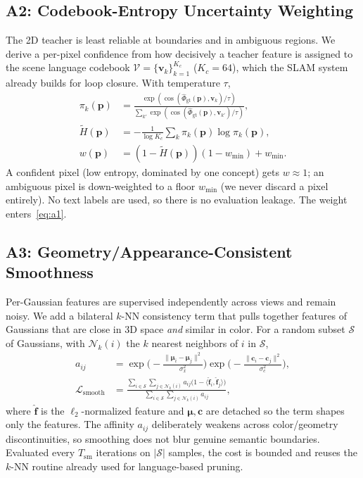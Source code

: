 \documentclass[10pt, journal]{IEEEtran}
\begin{document}
\subsection{A2: Codebook-Entropy Uncertainty Weighting}\label{sec:a2}
The 2D teacher is least reliable at boundaries and in ambiguous regions. We derive
a per-pixel confidence from how decisively a teacher feature is assigned to the
scene language codebook $\mathcal{V}=\{\mathbf{v}_k\}_{k=1}^{K_c}$ ($K_c\!=\!64$),
which the SLAM system already builds for loop closure. With temperature $\tau$,
\begin{align}
\pi_k(\mathbf{p}) &= \frac{\exp(\cos(\hat{\Phi}_{\text{gt}}(\mathbf{p}),\mathbf{v}_k)/\tau)}{\sum_{k'}\exp(\cos(\hat{\Phi}_{\text{gt}}(\mathbf{p}),\mathbf{v}_{k'})/\tau)},\\
\tilde{H}(\mathbf{p}) &= -\tfrac{1}{\log K_c}\textstyle\sum_k \pi_k(\mathbf{p})\log \pi_k(\mathbf{p}),\\
w(\mathbf{p}) &= (1-\tilde{H}(\mathbf{p}))(1-w_{\min}) + w_{\min}.
\label{eq:a2}
\end{align}
A confident pixel (low entropy, dominated by one concept) gets $w\!\approx\!1$; an
ambiguous pixel is down-weighted to a floor $w_{\min}$ (we never discard a pixel
entirely). No text labels are used, so there is no evaluation leakage. The weight
enters~\eqref{eq:a1}.

\subsection{A3: Geometry/Appearance-Consistent Smoothness}\label{sec:a3}
Per-Gaussian features are supervised independently across views and remain noisy.
We add a bilateral $k$-NN consistency term that pulls together features of
Gaussians that are close in 3D space \emph{and} similar in color. For a random
subset $\mathcal{S}$ of Gaussians, with $\mathcal{N}_k(i)$ the $k$ nearest
neighbors of $i$ in $\mathcal{S}$,
\begin{align}
a_{ij} &= \exp\!\Big(\!-\tfrac{\|\boldsymbol{\mu}_i-\boldsymbol{\mu}_j\|^2}{\sigma_x^2}\Big)\exp\!\Big(\!-\tfrac{\|\mathbf{c}_i-\mathbf{c}_j\|^2}{\sigma_c^2}\Big),\\
\mathcal{L}_{\text{smooth}} &= \frac{\sum_{i\in\mathcal{S}}\sum_{j\in\mathcal{N}_k(i)} a_{ij}\big(1-\langle \hat{\mathbf{f}}_i,\hat{\mathbf{f}}_j\rangle\big)}{\sum_{i\in\mathcal{S}}\sum_{j\in\mathcal{N}_k(i)} a_{ij}},
\label{eq:a3}
\end{align}
where $\hat{\mathbf{f}}$ is the $\ell_2$-normalized feature and
$\boldsymbol{\mu},\mathbf{c}$ are detached so the term shapes only the features.
The affinity $a_{ij}$ deliberately weakens across color/geometry discontinuities,
so smoothing does not blur genuine semantic boundaries. Evaluated every
$T_{\text{sm}}$ iterations on $|\mathcal{S}|$ samples, the cost is bounded and
reuses the $k$-NN routine already used for language-based pruning.
\end{document}
